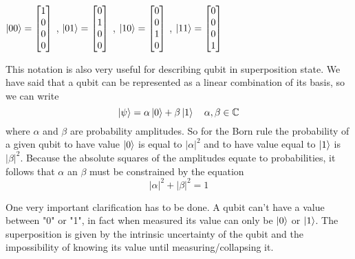 \documentclass[main.tex]{subfiles}
\theoremstyle{definition}
\begin{document}
		\begin{center}        
        $\ket{00} =
        \begin{bmatrix}
           1 \\
           0 \\
           0 \\
           0 
        \end{bmatrix}$
        ,
         $\ket{01} =
        \begin{bmatrix}
           0 \\
           1 \\
           0 \\
           0 
        \end{bmatrix}$
        ,
         $\ket{10} =
        \begin{bmatrix}
           0 \\
           0 \\
           1 \\
           0 
        \end{bmatrix}$
        ,
         $\ket{11} = 
		\begin{bmatrix}
           0 \\
           0 \\
           0 \\
           1 
         \end{bmatrix}$
        \end{center}
       	This notation is also very useful for describing qubit in superposition state. We have said that a qubit can be 
        represented as a linear combination of its basis, so we can write 
      	\begin{equation}
        \ket{\psi}=\alpha\ket{0}+\beta\ket{1} 
        \quad \alpha, \beta \in \mathbb{C}
        \end{equation}
        where $\alpha$ and $\beta$ are probability amplitudes. So for the Born rule the probability of a given qubit to have 
        value $\ket{0}$ is equal to $|\alpha|^2$
        and to have value equal to $\ket{1}$ is $|\beta|^2$. Because the absolute squares of the amplitudes equate to probabilities,
        it follows that $\alpha$ an $\beta$ must be constrained by the equation
        \begin{equation}
        |\alpha|^2+|\beta|^2=1
        \end{equation}
        
        One very important clarification has to be done. A qubit can't have a value between "0" or "1", in fact when measured its
        value can only be $\ket{0}$ or $\ket{1}$. The superposition is given by the intrinsic uncertainty of the qubit and the
        impossibility of knowing its value until measuring/collapsing it.
         
\end{document}
